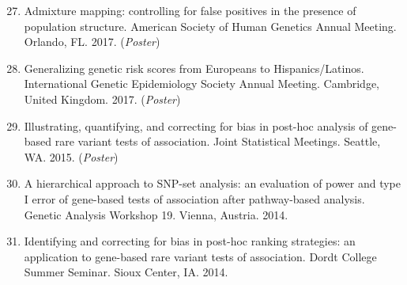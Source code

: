 \documentclass[margin]{res}
\newenvironment{benumerate}[1]{
    \let\oldItem\item
    \def\item{\addtocounter{enumi}{-2}\oldItem}
    
    \begin{enumerate}
    \setcounter{enumi}{#1}
    \addtocounter{enumi}{1}
}{
    \end{enumerate}
}
\begin{document}
\begin{resume}
\begin{benumerate}{26}
\item %
Admixture mapping: controlling for false positives in the presence of population structure. American Society of Human Genetics Annual Meeting. Orlando, FL. 2017. (\textit{Poster})

\item %
Generalizing genetic risk scores from Europeans to Hispanics/Latinos. International Genetic Epidemiology Society Annual Meeting. Cambridge, United Kingdom. 2017. (\textit{Poster})





\item %
Illustrating, quantifying, and correcting for bias in post-hoc analysis of gene-based rare variant tests of association. Joint Statistical Meetings. Seattle, WA. 2015. (\textit{Poster})


\item %
A hierarchical approach to SNP-set analysis: an evaluation of power and type I error of gene-based tests of association after pathway-based analysis. Genetic Analysis Workshop 19. Vienna, Austria. 2014.

\item %
Identifying and correcting for bias in post-hoc ranking strategies: an application to gene-based rare variant tests of association. Dordt College Summer Seminar. Sioux Center, IA. 2014.


\end{benumerate}
\end{resume}
\end{document}
